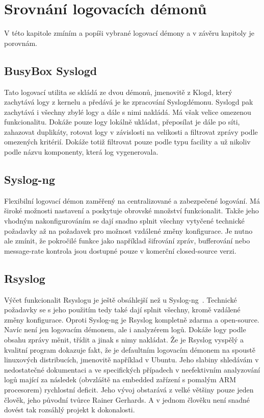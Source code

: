 \documentclass[thesis=B,czech]{FITthesis}[2012/06/26]
\begin{document}
\section{Srovnání logovacích démonů}
V této kapitole zmíním a popíši vybrané logovací démony a v závěru kapitoly je porovnám.

\subsection{BusyBox Syslogd}
Tato logovací utilita se skládá ze dvou démonů, jmenovitě z Klogd, který zachytává logy z kernelu a předává je ke zpracování Syslogdémonu. Syslogd pak zachytává i všechny zbylé logy a dále s nimi nakládá. Má však velice omezenou funkcionalitu. Dokáže pouze logy lokálně ukládat, přeposílat je dále po síti, zahazovat duplikáty, rotovat logy v závislosti na velikosti a filtrovat zprávy podle omezených kritérií. Dokáže totiž filtrovat pouze podle typu facility a už nikoliv podle názvu komponenty, která log vygenerovala.

\subsection{Syslog-ng}
Flexibilní logovací démon zaměřený na centralizované a zabezpečené logování. Má široké možnosti nastavení a poskytuje obrovské množství funkcionalit. Takže jeho vhodným nakonfigurováním se dají snadno splnit všechny vytyčené technické požadavky až na požadavek pro možnost vzdálené změny konfigurace.
Je nutno ale zmínit, že pokročilé funkce jako například šifrování zpráv, bufferování nebo message-rate kontrola jsou dostupné pouze v komerční closed-source verzi.

\subsection{Rsyslog}
Výčet funkcionalit Rsyslogu je ještě obsáhlejší než u Syslog-ng~\cite{Rsyslog-features}. Technické požadavky se s jeho použitím tedy také dají splnit všechny, kromě vzdálené změny konfigurace. Oproti Syslog-ng je Rsyslog kompletně zdarma a open-source. Navíc není jen logovacím démonem, ale i analyzérem logů. Dokáže logy podle obsahu zprávy měnit, třídit a jinak s nimy nakládat.
Že je Rsyslog vyspělý a kvalitní program dokazuje fakt, že je defaultním logovacím démonem na spoustě linuxových distribucích, jmenovitě například v Ubuntu.
Jeho slabiny shledávám v nedostatečné dokumentaci a ve specifických případech v neefektivním analyzování logů mající za následek (obvzláště na embedded zařízení s pomalým ARM procesorem) rychlostní deficit. Jeho vývoj obstarává z velké většiny pouze jeden člověk, jeho původní tvůrce Rainer Gerhards. A v jednom člověku není snadné dovést tak rozsáhlý projekt k dokonalosti.
\end{document}
